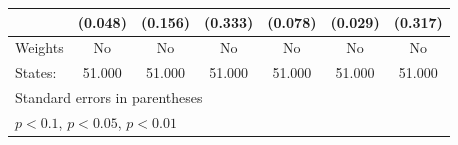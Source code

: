 {\begin{tabular}{l*{6}{c}}
            &     (0.048)         &     (0.156)         &     (0.333)         &     (0.078)         &     (0.029)         &     (0.317)         \\
\hline
Weights     &          No         &          No         &          No         &          No         &          No         &          No         \\
States:     &      51.000         &      51.000         &      51.000         &      51.000         &      51.000         &      51.000         \\
\hline\hline
\multicolumn{7}{l}{\footnotesize Standard errors in parentheses}\\
\multicolumn{7}{l}{\footnotesize \sym{*} \(p<0.1\), \sym{**} \(p<0.05\), \sym{***} \(p<0.01\)}\\
\end{tabular}
}
